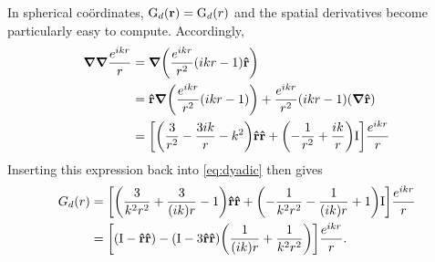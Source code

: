 In spherical co\"ordinates, $\mathrm{G}_d(\vb{r}) = \mathrm{G}_d(r)$ and the spatial derivatives become particularly easy to compute.
Accordingly,
\begin{equation}
  \begin{aligned}
    \grad\grad \frac{e^{ikr}}{r} &= \grad \qty(\frac{e^{ikr}}{r^2}(ikr - 1) \vu{r}) \\
    &= \vu{r}\grad \qty(\frac{e^{ikr}}{r^2}(ikr - 1)) + \frac{e^{ikr}}{r^2}(ikr - 1)\qty(\grad \vu{r}) \\
    &= \qty[\qty(\frac{3}{r^2}-\frac{3 i k}{r}-k^2) \vu{r}\vu{r} + \qty(- \frac{1}{r^2} + \frac{ik}{r}) \mathrm{I}] \frac{e^{ikr}}{r}
  \end{aligned}
\end{equation}
Inserting this expression back into \cref{eq:dyadic} then gives
\begin{equation}
  \begin{aligned}
    G_d(r) & = \qty[\qty(\frac{3}{k^2 r^2}+\frac{3}{(i k) r}-1) \vu{r}\vu{r} + \qty(-\frac{1}{k^2r^2} - \frac{1}{(ik)r} + 1) \mathrm{I}] \frac{e^{ikr}}{r} \\
    & = \qty[ \qty(\mathrm{I} - \vu{r}\vu{r}) - \qty(\mathrm{I} - 3\vu{r}\vu{r})\qty(\frac{1}{(ik)r} + \frac{1}{k^2 r^2})] \frac{e^{ikr}}{r}.
  \end{aligned}
  \label{eq:expanded dyadic}
\end{equation}

